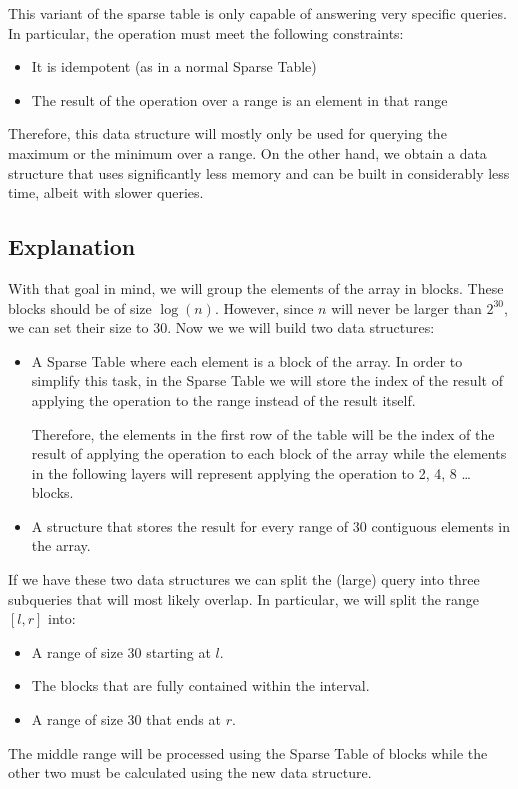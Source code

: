 This variant of the sparse table is only capable of answering very
specific queries. In particular, the operation must meet the following
constraints:
\begin{itemize}
		\setlength{\itemsep}{2pt}
		\item It is idempotent (as in a normal Sparse Table)
		\item The result of the operation over a range is an element
				in that range
\end{itemize}
Therefore, this data structure will mostly only be used for querying the
maximum or the minimum over a range. On the other hand, we obtain a data 
structure that uses significantly less memory and can be built in
considerably less time, albeit with slower queries.
\subsection*{Explanation}
With that goal in mind, we will group the elements of the array in blocks.
These blocks should be of size $\log (n)$. However, since $n$ will never
be larger than $2^{30}$, we can set their size to 30. Now we we will build 
two data structures:
\begin{itemize}
		\setlength{\itemsep}{2pt}
		\item A Sparse Table where each element is a block of the array. 
				In order to simplify this task, in the Sparse Table we will
				store the index of the result of applying the operation to the 
				range instead of the result itself. 

				Therefore, the elements in the first row of the table will be the 
				index of the result of applying the operation to each block of the array while
				the elements in the following layers will represent applying the
				operation to 2, 4, 8 \dots blocks.

		\item A structure that stores the result for every range of 30 contiguous 
				elements in the array.
\end{itemize}

If we have these two data structures we can split the (large) query into three subqueries
that will most likely overlap. In particular, we will split the range $[l, r]$ into:
\begin{itemize}
		\setlength{\itemsep}{0pt}
		\item A range of size 30 starting at $l$.
		\item The blocks that are fully contained within the interval.
		\item A range of size 30 that ends at $r$.
\end{itemize}
The middle range will be processed using the Sparse Table of blocks while the other 
two must be calculated using the new data structure.

